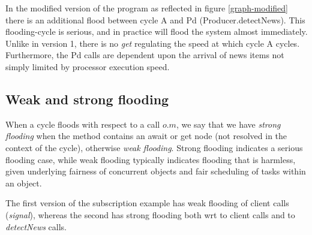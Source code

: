 \documentclass[12pt]{article}%
\begin{document}
In the modified version of the program as reflected in figure \ref{graph-modified} there is an additional flood between cycle A and
Pd (Producer.detectNews). This flooding-cycle is serious, and in practice will flood the system almost immediately.
Unlike in version 1, there is no \emph{get} regulating the speed at which cycle A cycles. Furthermore, the Pd calls are dependent upon the
arrival of news items not simply limited by processor execution speed.

\subsection{Weak and strong flooding}
When a cycle floods with respect to a call $o.m$,
we say that we have \emph{strong flooding} 
when the method contains an  await or get node
(not resolved in the context of the cycle),
otherwise \emph{weak flooding}.
Strong flooding indicates a serious flooding case,
while weak flooding typically indicates flooding 
that is harmless, given underlying fairness of concurrent objects
and  fair scheduling of tasks within an object. 

The first version of the subscription example
has weak flooding of client calls (\emph{signal}),
whereas the second has strong flooding both wrt
to client calls and  to \emph{detectNews} calls.



% 

%
\end{document}

